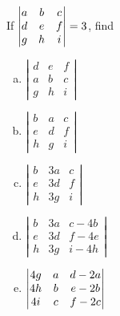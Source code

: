 \begin{prob}
\begin{enumerate}[a)]
\end{enumerate}

\end{prob} \begin{prob} \label{prob21.2} If $\left|\begin{matrix} a&b&c\cr d&e&f\cr g&h&i\end{matrix} \right|=3$,
find 
\medskip
\begin{enumerate}[a)]
 
\item $\left|\begin{matrix}  d&e&f \\ a&b&c\\ g&h&i\end{matrix}\right|$
\medskip
\item\sov $\left|\begin{matrix}  b&a&c\\ e&d&f\\ h&g&i\end{matrix}\right|$
\medskip
\item $\left|\begin{matrix}  b&3a&c\\ e&3d&f\\ h&3g&i\end{matrix}\right|$
\medskip
\item\sov $\left|\begin{matrix}  b&3a&c-4b\\ e&3d&f-4e\\ h&3g&i-4h\end{matrix}\right|$
\medskip
\item $\left|\begin{matrix} 4g&a&d-2a\cr4h&b&e-2b\cr4i&c&f-2c \end{matrix}\right|$
\medskip

\end{enumerate}

\end{prob} \begin{prob} 
\label{prob21.3} 

 

\begin{enumerate}[a)]



\end{enumerate}
\end{prob}
